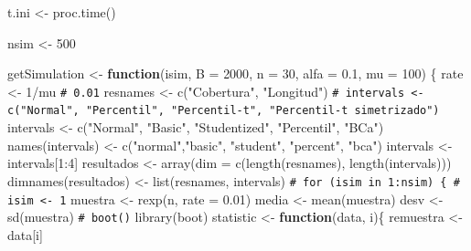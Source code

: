 \documentclass[
]{book}
\newenvironment{Shaded}{\begin{snugshade}}{\end{snugshade}}
\newcommand{\AttributeTok}[1]{\textcolor[rgb]{0.77,0.63,0.00}{#1}}
\newcommand{\CommentTok}[1]{\textcolor[rgb]{0.56,0.35,0.01}{\textit{#1}}}
\newcommand{\ControlFlowTok}[1]{\textcolor[rgb]{0.13,0.29,0.53}{\textbf{#1}}}
\newcommand{\DecValTok}[1]{\textcolor[rgb]{0.00,0.00,0.81}{#1}}
\newcommand{\FloatTok}[1]{\textcolor[rgb]{0.00,0.00,0.81}{#1}}
\newcommand{\FunctionTok}[1]{\textcolor[rgb]{0.00,0.00,0.00}{#1}}
\newcommand{\NormalTok}[1]{#1}
\newcommand{\OtherTok}[1]{\textcolor[rgb]{0.56,0.35,0.01}{#1}}
\newcommand{\SpecialCharTok}[1]{\textcolor[rgb]{0.00,0.00,0.00}{#1}}
\newcommand{\StringTok}[1]{\textcolor[rgb]{0.31,0.60,0.02}{#1}}
\theoremstyle{break}
\theoremstyle{nonumberplain}
\renewcommand{\CommentTok}[1]{\textcolor[rgb]{0.41,0.41,0.41}{\texttt{#1}}}
\begin{document}
\begin{Shaded}
\begin{Highlighting}[]
\NormalTok{t.ini }\OtherTok{\textless{}{-}} \FunctionTok{proc.time}\NormalTok{()}

\NormalTok{nsim }\OtherTok{\textless{}{-}} \DecValTok{500}

\NormalTok{getSimulation }\OtherTok{\textless{}{-}} \ControlFlowTok{function}\NormalTok{(isim, }\AttributeTok{B =} \DecValTok{2000}\NormalTok{, }\AttributeTok{n =} \DecValTok{30}\NormalTok{, }\AttributeTok{alfa =} \FloatTok{0.1}\NormalTok{, }\AttributeTok{mu =} \DecValTok{100}\NormalTok{) \{}
\NormalTok{    rate }\OtherTok{\textless{}{-}} \DecValTok{1}\SpecialCharTok{/}\NormalTok{mu }\CommentTok{\# 0.01}
\NormalTok{    resnames }\OtherTok{\textless{}{-}} \FunctionTok{c}\NormalTok{(}\StringTok{"Cobertura"}\NormalTok{, }\StringTok{"Longitud"}\NormalTok{)}
    \CommentTok{\# intervals \textless{}{-} c("Normal", "Percentil", "Percentil{-}t", "Percentil{-}t simetrizado")}
\NormalTok{    intervals }\OtherTok{\textless{}{-}} \FunctionTok{c}\NormalTok{(}\StringTok{"Normal"}\NormalTok{, }\StringTok{"Basic"}\NormalTok{, }\StringTok{"Studentized"}\NormalTok{, }\StringTok{"Percentil"}\NormalTok{, }\StringTok{"BCa"}\NormalTok{)}
    \FunctionTok{names}\NormalTok{(intervals) }\OtherTok{\textless{}{-}} \FunctionTok{c}\NormalTok{(}\StringTok{"normal"}\NormalTok{,}\StringTok{"basic"}\NormalTok{, }\StringTok{"student"}\NormalTok{, }\StringTok{"percent"}\NormalTok{, }\StringTok{"bca"}\NormalTok{)}
\NormalTok{    intervals }\OtherTok{\textless{}{-}}\NormalTok{ intervals[}\DecValTok{1}\SpecialCharTok{:}\DecValTok{4}\NormalTok{]}
\NormalTok{    resultados }\OtherTok{\textless{}{-}} \FunctionTok{array}\NormalTok{(}\AttributeTok{dim =} \FunctionTok{c}\NormalTok{(}\FunctionTok{length}\NormalTok{(resnames), }\FunctionTok{length}\NormalTok{(intervals)))}
    \FunctionTok{dimnames}\NormalTok{(resultados) }\OtherTok{\textless{}{-}} \FunctionTok{list}\NormalTok{(resnames, intervals)}
    \CommentTok{\# for (isim in 1:nsim) \{ \# isim \textless{}{-} 1}
\NormalTok{    muestra }\OtherTok{\textless{}{-}} \FunctionTok{rexp}\NormalTok{(n, }\AttributeTok{rate =} \FloatTok{0.01}\NormalTok{)}
\NormalTok{    media }\OtherTok{\textless{}{-}} \FunctionTok{mean}\NormalTok{(muestra)}
\NormalTok{    desv }\OtherTok{\textless{}{-}} \FunctionTok{sd}\NormalTok{(muestra)}
    \CommentTok{\# boot()}
    \FunctionTok{library}\NormalTok{(boot)}
\NormalTok{    statistic }\OtherTok{\textless{}{-}} \ControlFlowTok{function}\NormalTok{(data, i)\{}
\NormalTok{      remuestra }\OtherTok{\textless{}{-}}\NormalTok{ data[i]}

\end{Highlighting}
\end{Shaded}
\end{document}
